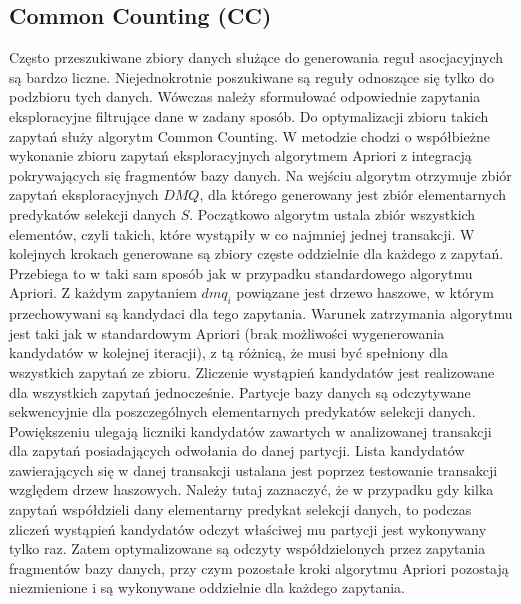 \subsection{Common Counting (CC) \cite{WojciechowskiCC}}
\label{c325}
Często przeszukiwane zbiory danych służące do generowania reguł asocjacyjnych są bardzo liczne. Niejednokrotnie poszukiwane są reguły odnoszące się tylko do podzbioru tych danych. Wówczas należy sformułować odpowiednie zapytania eksploracyjne filtrujące dane w zadany sposób. Do optymalizacji zbioru takich zapytań służy algorytm Common Counting. W metodzie chodzi o współbieżne wykonanie zbioru zapytań eksploracyjnych algorytmem Apriori z integracją pokrywających się fragmentów bazy danych. Na wejściu algorytm otrzymuje zbiór zapytań eksploracyjnych \(DMQ\), dla którego generowany jest zbiór elementarnych predykatów selekcji danych \(S\). Początkowo algorytm ustala zbiór wszystkich elementów, czyli takich, które wystąpiły w co najmniej jednej transakcji. W kolejnych krokach generowane są zbiory częste oddzielnie dla każdego z zapytań. Przebiega to w taki sam sposób jak w przypadku standardowego algorytmu Apriori. Z każdym zapytaniem \(dmq_i\) powiązane jest drzewo haszowe, w którym przechowywani są kandydaci dla tego zapytania. Warunek zatrzymania algorytmu jest taki jak w standardowym Apriori (brak możliwości wygenerowania kandydatów w kolejnej iteracji), z tą różnicą, że musi być spełniony dla wszystkich zapytań ze zbioru. 
Zliczenie wystąpień kandydatów jest realizowane dla wszystkich zapytań jednocześnie. Partycje bazy danych są odczytywane sekwencyjnie dla poszczególnych elementarnych predykatów selekcji danych. Powiększeniu ulegają liczniki kandydatów zawartych w analizowanej transakcji dla zapytań posiadających odwołania do danej partycji. Lista kandydatów zawierających się w danej transakcji ustalana jest poprzez testowanie transakcji względem drzew haszowych. Należy tutaj zaznaczyć, że w przypadku gdy kilka zapytań współdzieli dany elementarny predykat selekcji danych, to podczas zliczeń wystąpień kandydatów odczyt właściwej mu partycji jest wykonywany tylko raz. Zatem optymalizowane są odczyty współdzielonych przez zapytania fragmentów bazy danych, przy czym pozostałe kroki algorytmu Apriori pozostają niezmienione i są wykonywane oddzielnie dla każdego zapytania. 

